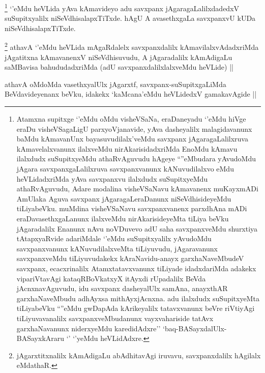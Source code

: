 \begin{artha}
\footnote{Atamxna supitxge `\stext'eMdu oMdu visheVSaNa, eraDaneyadu `\stext'eMdu hiVge eraDu visheVSagaLigU parxyoVjanavide, yAva dasheyalilx malagidavanunx baMdu kAmavanUnx bayasuvudilalx'veMdu savxpanx jAgaragaLalilxruva kAmavelalxvanunx ilalxveMdu nirAkarisidadxriMda EnoMdu kAmavu ilalxdudx suSupitxyeMdu athaRvAguvudu hAgeye ``\stext''eMbudara yAvudoMdu jAgara savxpanxgaLalilxruva savxpanxvanunx kANuvudilalxvo eMdu heVLidadxriMda yAva savxpanxvu ilalxdudx suSupitxyeMdu athaRvAguvudu, Adare modalina visheVSaNavu kAmavanenx muKayxmADi AmUlaka Aguva savxpanx jAgaragaLeraDanunx niSeVdhisideyeMdu tiLiyabeVku. muMdina visheVSaNavu savxpanxvanenx parxdhAna mADi eraDavasethxgaLanunx ilalxveMdu nirAkarisideyeMta tiLiya beVku  jAgaradalilx Enanunx nAvu noVDuvevo adU saha savxpanxveMdu shurxtiya tAtapxyaRvide adariMdale `\stext'eMdu suSupitxyalilx yAvudoMdu savxpanxvanunx kANuvudilalxveMta tiLiyuvudu, jAgaravanunx savxpanxveMdu tiLiyuvudakekx kAraNavidu-anayx garxhaNaveMbudeV savxpanx, ecacxrinalilx Atamxtatavxvanunx tiLiyade idadxdariMda adakekx vipariVtavAgi kataqRBoVkatxyX itAyxdi rUpadalilx BeVda jAcnxnavAguvudu, idu savxpanx dasheyalUlx samAna, anayxthAR garxhaNaveMbudu adhAyxsa mithAyxjAcnxna. adu ilalxdudx suSupitxyeMta tiLiyabeVku ``\stext''eMdu gwDapAda kArikeyalilx tatavxvanunx beVre riVtiyAgi tiLiyuvavanalilx savxpanxveMbudanunx vayxvahariside tatAvx garxhaNavanunx niderxyeMdu karedidAdxre'' `baq-BASayxdalUlx-BASayxkAraru `\stext' `\stext'yeMdu heVLidAdxre.}
`\stext'eMdu heVLida yAva kAmavideyo adu savxpanx jAgaragaLalilxdadedxV suSupitxyalilx niSeVdhisalapxTiTxde. hAgU A avasethxgaLa savxpanxvU kUDa niSeVdhisalapxTiTxde.
\end{artha}


\begin{artha}
\footnote{jAgarxtitxnalilx kAmAdigaLu abAdhitavAgi iruvavu, savxpanxdalilx hAgilalx eMdathaR.}
athavA `\stext'eMdu heVLida mAgaRdalelx savxpanxdalilx kAmavilalxvAdadxriMda jAgatitxna kAmavanenxV niSeVdhisuvudu, A jAgaradalilx kAmAdigaLu saMBavisa bahududadxriMda (adU savxpanxdalilxlalxveMdu heVLide) ||
\end{artha}


\begin{artha}
athavA oMdoMda vasethxyalUlx jAgarxtf, savxpanx-suSupitxgaLiMda BeVdavideyenanx beVku, idakekx `kaMcana'eMdu heVLidedxV gamakavAgide ||
\end{artha}

